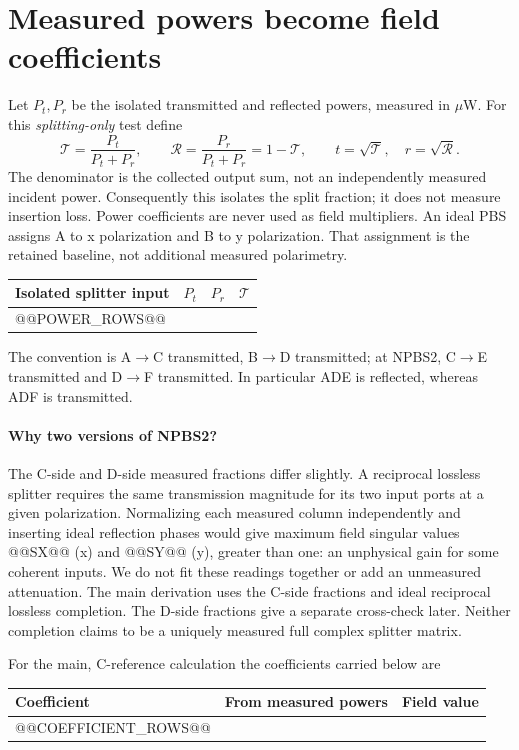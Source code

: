 \documentclass[11pt,a4paper]{article}
\begin{document}
\section{Measured powers become field coefficients}
Let $P_t,P_r$ be the isolated transmitted and reflected powers, measured in
$\mu$W. For this \emph{splitting-only} test define
\begin{equation}
\mathcal T=\frac{P_t}{P_t+P_r},\qquad
\mathcal R=\frac{P_r}{P_t+P_r}=1-\mathcal T,\qquad
\boxed{t=\sqrt{\mathcal T},\quad r=\sqrt{\mathcal R}.}
\end{equation}
The denominator is the collected output sum, not an independently measured
incident power. Consequently this isolates the split fraction; it does not
measure insertion loss. Power coefficients are never used as field multipliers.
An ideal PBS assigns A to x polarization and B to y polarization. That
assignment is the retained baseline, not additional measured polarimetry.

\begin{center}\small
\begin{tabular}{lrrr}\toprule
Isolated splitter input & $P_t$ & $P_r$ & $\mathcal T$ \\\midrule
@@POWER_ROWS@@
\bottomrule\end{tabular}\end{center}
The convention is A$\to$C transmitted, B$\to$D transmitted; at NPBS2,
C$\to$E transmitted and D$\to$F transmitted. In particular ADE is reflected,
whereas ADF is transmitted.

\paragraph{Why two versions of NPBS2?}
The C-side and D-side measured fractions differ slightly. A reciprocal lossless
splitter requires the same transmission magnitude for its two input ports at
a given polarization. Normalizing each measured column independently and
inserting ideal reflection phases would give maximum field singular values
@@SX@@ (x) and @@SY@@ (y), greater than one: an unphysical gain for some coherent
inputs. We do not fit these readings together or add an unmeasured attenuation.
The main derivation uses the C-side fractions and ideal reciprocal lossless
completion. The D-side fractions give a separate cross-check later. Neither
completion claims to be a uniquely measured full complex splitter matrix.

For the main, C-reference calculation the coefficients carried below are
\begin{center}\small
\begin{tabular}{lll}\toprule
Coefficient & From measured powers & Field value \\\midrule
@@COEFFICIENT_ROWS@@
\bottomrule\end{tabular}\end{center}
\end{document}
